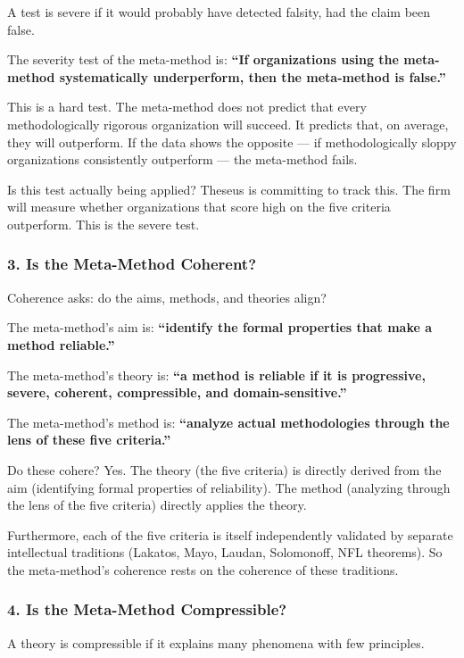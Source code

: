 \documentclass[11pt,letterpaper]{article}
\begin{document}
A test is severe if it would probably have detected falsity, had the claim been false.

The severity test of the meta-method is: \textbf{``If organizations using the meta-method systematically underperform, then the meta-method is false.''}

This is a hard test. The meta-method does not predict that every methodologically rigorous organization will succeed. It predicts that, on average, they will outperform. If the data shows the opposite — if methodologically sloppy organizations consistently outperform — the meta-method fails.

Is this test actually being applied? Theseus is committing to track this. The firm will measure whether organizations that score high on the five criteria outperform. This is the severe test.

\subsubsection*{3. Is the Meta-Method Coherent?}

Coherence asks: do the aims, methods, and theories align?

The meta-method's aim is: \textbf{``identify the formal properties that make a method reliable.''}

The meta-method's theory is: \textbf{``a method is reliable if it is progressive, severe, coherent, compressible, and domain-sensitive.''}

The meta-method's method is: \textbf{``analyze actual methodologies through the lens of these five criteria.''}

Do these cohere? Yes. The theory (the five criteria) is directly derived from the aim (identifying formal properties of reliability). The method (analyzing through the lens of the five criteria) directly applies the theory.

Furthermore, each of the five criteria is itself independently validated by separate intellectual traditions (Lakatos, Mayo, Laudan, Solomonoff, NFL theorems). So the meta-method's coherence rests on the coherence of these traditions.

\subsubsection*{4. Is the Meta-Method Compressible?}

A theory is compressible if it explains many phenomena with few principles.
\end{document}
